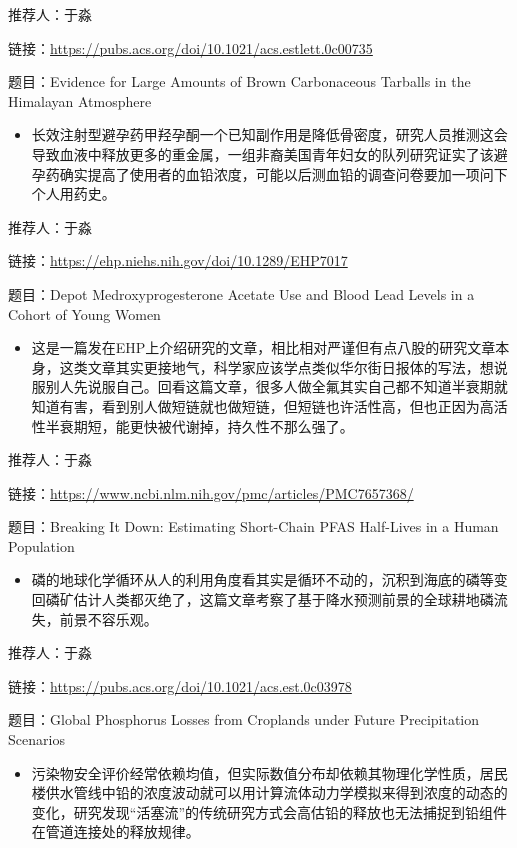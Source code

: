 \documentclass[
]{book}
\providecommand{\tightlist}{%
  \setlength{\itemsep}{0pt}\setlength{\parskip}{0pt}}
\begin{document}
推荐人：于淼

链接：\url{https://pubs.acs.org/doi/10.1021/acs.estlett.0c00735}

题目：Evidence for Large Amounts of Brown Carbonaceous Tarballs in the Himalayan Atmosphere

\begin{itemize}
\tightlist
\item
  长效注射型避孕药甲羟孕酮一个已知副作用是降低骨密度，研究人员推测这会导致血液中释放更多的重金属，一组非裔美国青年妇女的队列研究证实了该避孕药确实提高了使用者的血铅浓度，可能以后测血铅的调查问卷要加一项问下个人用药史。
\end{itemize}

推荐人：于淼

链接：\url{https://ehp.niehs.nih.gov/doi/10.1289/EHP7017}

题目：Depot Medroxyprogesterone Acetate Use and Blood Lead Levels in a Cohort of Young Women

\begin{itemize}
\tightlist
\item
  这是一篇发在EHP上介绍研究的文章，相比相对严谨但有点八股的研究文章本身，这类文章其实更接地气，科学家应该学点类似华尔街日报体的写法，想说服别人先说服自己。回看这篇文章，很多人做全氟其实自己都不知道半衰期就知道有害，看到别人做短链就也做短链，但短链也许活性高，但也正因为高活性半衰期短，能更快被代谢掉，持久性不那么强了。
\end{itemize}

推荐人：于淼

链接：\url{https://www.ncbi.nlm.nih.gov/pmc/articles/PMC7657368/}

题目：Breaking It Down: Estimating Short-Chain PFAS Half-Lives in a Human Population

\begin{itemize}
\tightlist
\item
  磷的地球化学循环从人的利用角度看其实是循环不动的，沉积到海底的磷等变回磷矿估计人类都灭绝了，这篇文章考察了基于降水预测前景的全球耕地磷流失，前景不容乐观。
\end{itemize}

推荐人：于淼

链接：\url{https://pubs.acs.org/doi/10.1021/acs.est.0c03978}

题目：Global Phosphorus Losses from Croplands under Future Precipitation Scenarios

\begin{itemize}
\tightlist
\item
  污染物安全评价经常依赖均值，但实际数值分布却依赖其物理化学性质，居民楼供水管线中铅的浓度波动就可以用计算流体动力学模拟来得到浓度的动态的变化，研究发现``活塞流''的传统研究方式会高估铅的释放也无法捕捉到铅组件在管道连接处的释放规律。
\end{itemize}
\end{document}
